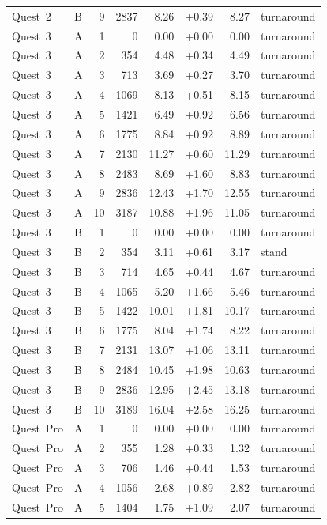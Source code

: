 \documentclass[11pt,a4paper]{article}
\begin{document}
{\begin{longtable}{llrrrrrl}
Quest~2 & B & 9 & 2837 & 8.26 & +0.39 & 8.27 & turnaround \\
\addlinespace
Quest~3 & A & 1 & 0 & 0.00 & +0.00 & 0.00 & turnaround \\
Quest~3 & A & 2 & 354 & 4.48 & +0.34 & 4.49 & turnaround \\
Quest~3 & A & 3 & 713 & 3.69 & +0.27 & 3.70 & turnaround \\
Quest~3 & A & 4 & 1069 & 8.13 & +0.51 & 8.15 & turnaround \\
Quest~3 & A & 5 & 1421 & 6.49 & +0.92 & 6.56 & turnaround \\
Quest~3 & A & 6 & 1775 & 8.84 & +0.92 & 8.89 & turnaround \\
Quest~3 & A & 7 & 2130 & 11.27 & +0.60 & 11.29 & turnaround \\
Quest~3 & A & 8 & 2483 & 8.69 & +1.60 & 8.83 & turnaround \\
Quest~3 & A & 9 & 2836 & 12.43 & +1.70 & 12.55 & turnaround \\
Quest~3 & A & 10 & 3187 & 10.88 & +1.96 & 11.05 & turnaround \\
\addlinespace
Quest~3 & B & 1 & 0 & 0.00 & +0.00 & 0.00 & turnaround \\
Quest~3 & B & 2 & 354 & 3.11 & +0.61 & 3.17 & stand \\
Quest~3 & B & 3 & 714 & 4.65 & +0.44 & 4.67 & turnaround \\
Quest~3 & B & 4 & 1065 & 5.20 & +1.66 & 5.46 & turnaround \\
Quest~3 & B & 5 & 1422 & 10.01 & +1.81 & 10.17 & turnaround \\
Quest~3 & B & 6 & 1775 & 8.04 & +1.74 & 8.22 & turnaround \\
Quest~3 & B & 7 & 2131 & 13.07 & +1.06 & 13.11 & turnaround \\
Quest~3 & B & 8 & 2484 & 10.45 & +1.98 & 10.63 & turnaround \\
Quest~3 & B & 9 & 2836 & 12.95 & +2.45 & 13.18 & turnaround \\
Quest~3 & B & 10 & 3189 & 16.04 & +2.58 & 16.25 & turnaround \\
\addlinespace
Quest~Pro & A & 1 & 0 & 0.00 & +0.00 & 0.00 & turnaround \\
Quest~Pro & A & 2 & 355 & 1.28 & +0.33 & 1.32 & turnaround \\
Quest~Pro & A & 3 & 706 & 1.46 & +0.44 & 1.53 & turnaround \\
Quest~Pro & A & 4 & 1056 & 2.68 & +0.89 & 2.82 & turnaround \\
Quest~Pro & A & 5 & 1404 & 1.75 & +1.09 & 2.07 & turnaround \\

\end{longtable}}
\end{document}
